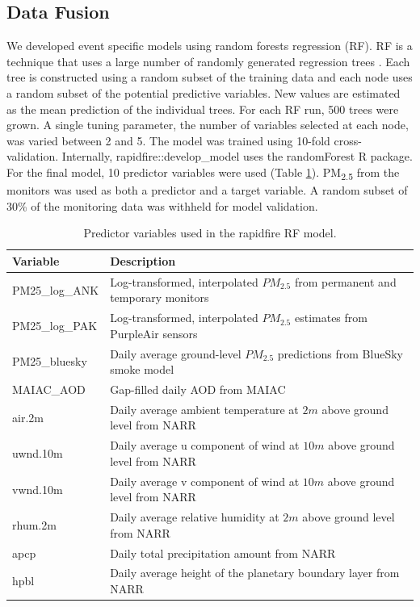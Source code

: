 \documentclass[gmd, manuscript]{copernicus}
\begin{document}
\subsection{Data Fusion}

We developed event specific models using random forests regression (RF).
RF is a technique that uses a large number of randomly generated
regression trees \citep{Breiman2001}. Each tree is constructed using a
random subset of the training data and each node uses a random subset of
the potential predictive variables. New values are estimated as the mean
prediction of the individual trees. For each RF run, 500 trees were
grown. A single tuning parameter, the number of variables selected at
each node, was varied between 2 and 5. The model was trained using
10-fold cross-validation. Internally, rapidfire::develop\_model uses the
randomForest R package.\\
For the final model, 10 predictor variables were used (Table
\ref{table:1}). PM\textsubscript{2.5} from the monitors was used as both
a predictor and a target variable. A random subset of 30\% of the
monitoring data was withheld for model validation.

\begin{table}[h]
\caption{Predictor variables used in the rapidfire RF model.}
\begin{tabular}{ll}
Variable       & Description                                                                    \\ \hline
PM25\_log\_ANK & Log-transformed, interpolated $PM_{2.5}$ from permanent and temporary monitors \\
PM25\_log\_PAK & Log-transformed, interpolated $PM_{2.5}$ estimates from PurpleAir sensors      \\
PM25\_bluesky  & Daily average ground-level $PM_{2.5}$ predictions from BlueSky smoke model     \\
MAIAC\_AOD     & Gap-filled  daily AOD from MAIAC                                               \\
air.2m         & Daily average ambient temperature at $2\unit{m}$ above ground level from NARR  \\
uwnd.10m       & Daily average u component of wind at $10\unit{m}$ above ground level from NARR \\
vwnd.10m       & Daily average v component of wind at $10\unit{m}$ above ground level from NARR \\
rhum.2m        & Daily average relative humidity at $2\unit{m}$ above ground level from NARR    \\
apcp           & Daily total precipitation amount from NARR                                     \\
hpbl           & Daily average height of the planetary boundary layer from NARR                
\end{tabular}
\label{table:1}
\end{table}
\end{document}
